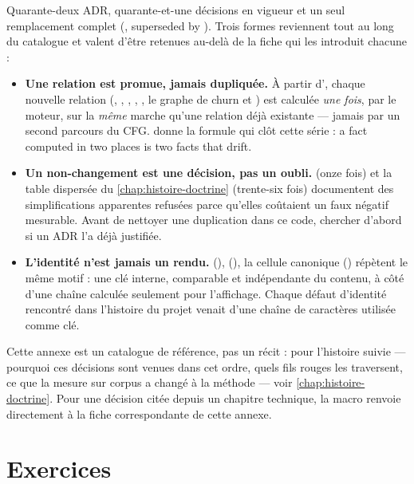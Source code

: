 \begin{resume}
Quarante-deux ADR, quarante-et-une décisions en vigueur et un seul remplacement
complet (, superseded by ). Trois formes reviennent tout au
long du catalogue et valent d'être retenues au-delà de la fiche qui les
introduit chacune :

\begin{itemize}
  \item \textbf{Une relation est promue, jamais dupliquée.} À partir
    d', chaque nouvelle relation (,
    , , ,
    , le graphe de churn et )
    est calculée \emph{une fois}, par le moteur, sur la \emph{même} marche
    qu'une relation déjà existante --- jamais par un second parcours du CFG.
     donne la formule qui clôt cette série : \og a fact computed in
    two places is two facts that drift\fg{}.
  \item \textbf{Un non-changement est une décision, pas un oubli.} 
    (onze fois) et la table dispersée du \cref{chap:histoire-doctrine}
    (trente-six fois) documentent des simplifications apparentes refusées
    parce qu'elles coûtaient un faux négatif mesurable. Avant de
    \og nettoyer\fg{} une duplication dans ce code, chercher d'abord si un ADR
    l'a déjà justifiée.
  \item \textbf{L'identité n'est jamais un rendu.}  (),
     (), la cellule canonique 
    () répètent le même motif : une clé interne, comparable et
    indépendante du contenu, à côté d'une chaîne calculée seulement pour
    l'affichage. Chaque défaut d'identité rencontré dans l'histoire du projet
    venait d'une chaîne de caractères utilisée comme clé.
\end{itemize}

Cette annexe est un catalogue de référence, pas un récit : pour l'histoire
suivie --- pourquoi ces décisions sont venues dans cet ordre, quels fils
rouges les traversent, ce que la mesure sur corpus a changé à la méthode ---
voir \cref{chap:histoire-doctrine}. Pour une décision citée depuis un
chapitre technique, la macro  renvoie
directement à la fiche correspondante de cette annexe.
\end{resume}

\section*{Exercices}

